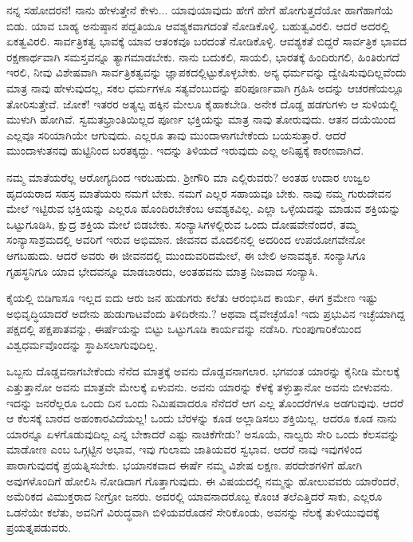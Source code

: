 ನನ್ನ ಸಹೋದರನೆ! ನಾನು ಹೇಳುತ್ತೇನೆ ಕೇಳು... ಯಾವುಯಾವುದು ಹೇಗೆ ಹೇಗೆ ಹೋಗುತ್ತದೆಯೋ ಹಾಗೆಹಾಗೆಯೆ ಬಿಡು. ಯಾವ ಬಾಹ್ಯ ಅನುಷ್ಠಾನ ಪದ್ದತಿಯೂ ಆವಶ್ಯಕವಾಗದಂತೆ ನೋಡಿಕೊಳ್ಳಿ. ಬಹುತ್ವವಿರಲಿ. ಆದರೆ ಅದರಲ್ಲಿ ಏಕತ್ವವಿರಲಿ. ಸಾರ್ವತ್ರಿ\break ಕತ್ವ ಭಾವಕ್ಕೆ ಯಾವ ಆತಂಕವೂ ಬರದಂತೆ ನೋಡಿಕೊಳ್ಳಿ. ಆವಶ್ಯಕತೆ ಬಿದ್ದರೆ ಸಾರ್ವತ್ರಿಕ ಭಾವದ ರಕ್ಷಣಾರ್ಥವಾಗಿ ಸಮಸ್ತವನ್ನೂ ತ್ಯಾಗಮಾಡಬೇಕು. ನಾನು ಬದುಕಲಿ, ಸಾಯಲಿ, ಭಾರತಕ್ಕೆ ಹಿಂದಿರುಗಲಿ, ಹಿಂತಿರುಗದೆ ಇರಲಿ, ನೀವು ವಿಶೇಷವಾಗಿ ಸಾರ್ವತ್ರಿಕತ್ವವನ್ನು ಜ್ಞಾಪಕದಲ್ಲಿಟ್ಟುಕೊಳ್ಳಬೇಕು. ಅನ್ಯ ಧರ್ಮವನ್ನು ದ್ವೇಷಿಸುವುದಿಲ್ಲವೆಂದು ಮಾತ್ರ ನಾವು ಹೇಳುವುದಲ್ಲ, ಸಕಲ ಧರ್ಮಗಳೂ ಸತ್ಯವೆಂಬುದನ್ನು ಪರಿಪೂರ್ಣವಾಗಿ ಗ್ರಹಿಸಿ ಅದನ್ನು ಆಚರಣೆಯಲ್ಲೂ ತೋರಿಸುತ್ತೇವೆ. ಜೋಕೆ! ಇತರರ ಅತ್ಯಲ್ಪ ಹಕ್ಕಿನ ಮೇಲೂ ಕೈಹಾಕಬೇಡಿ. ಅನೇಕ ದೊಡ್ಡ ಹಡಗುಗಳು ಆ ಸುಳಿಯಲ್ಲಿ ಮುಳುಗಿ ಹೋಗಿವೆ. ಸ್ವಮತಭ್ರಾಂತಿಯಿಲ್ಲದ ಪೂರ್ಣ ಭಕ್ತಿಯನ್ನು ಮಾತ್ರ ನಾವು ತೋರುವುದು. ಆತನ ದಯೆಯಿಂದ ಎಲ್ಲವೂ ಸರಿಯಾಗಿಯೇ ಆಗುವುದು. ಎಲ್ಲರೂ ತಾವು ಮುಂದಾಳಾಗಬೇಕೆಂದು ಬಯಸುತ್ತಾರೆ. ಆದರೆ ಮುಂದಾಳುತನವು ಹುಟ್ಟಿನಿಂದ ಬರತಕ್ಕದ್ದು. ಇದನ್ನು ತಿಳಿಯದೆ ಇರುವುದು ಎಲ್ಲ ಅನಿಷ್ಟಕ್ಕೆ ಕಾರಣವಾಗಿದೆ.

ನಮ್ಮ ಮಾತೆಯರೆಲ್ಲ ಆರೋಗ್ಯದಿಂದ ಇರಬಹುದು. ಶ‍್ರೀಗೌರಿ ಮಾ ಎಲ್ಲಿರುವರು? ಅಂತಹ ಉದಾರ ಉಜ್ವಲ ಹೃದಯರಾದ ಸಹಸ್ರ ಮಾತೆಯರು ನಮಗೆ ಬೇಕು. ನಮಗೆ ಎಲ್ಲರ ಸಹಾಯವೂ ಬೇಕು. ನಾವು ನಮ್ಮ ಗುರುದೇವನ ಮೇಲೆ ಇಟ್ಟಿರುವ ಭಕ್ತಿಯನ್ನು ಎಲ್ಲರೂ ಹೊಂದಿರಬೇಕೆಂಬ ಆವಶ್ಯಕವಿಲ್ಲ. ಎಲ್ಲಾ ಒಳ್ಳೆಯದನ್ನು ಮಾಡುವ ಶಕ್ತಿಯನ್ನು ಒಟ್ಟುಗೂಡಿಸಿ, ಕ್ಷುದ್ರ ಶಕ್ತಿಯ ಮೇಲೆ ಬಿಡಬೇಕು. ಸಂನ್ಯಾಸಿಗಳಲ್ಲಿರುವ ಒಂದು ದೋಷವೇನೆಂದರೆ, ತಮ್ಮ ಸಂನ್ಯಾಸಾಶ್ರಮದಲ್ಲಿ ಅವರಿಗೆ ಇರುವ ಅಭಿಮಾನ. ಜೀವನದ ಮೊದಲಿನಲ್ಲಿ ಅದರಿಂದ ಉಪಯೋಗವೇನೋ ಆಗಬಹುದು. ಆದರೆ ಅವರು ಈ ಜೀವನದಲ್ಲಿ ಮುಂದುವರಿದಮೇಲೆ, ಈ ಬೇಲಿ ಅನಾವಶ್ಯಕ. ಸಂನ್ಯಾಸಿಗೂ ಗೃಹಸ್ಥನಿಗೂ ಯಾವ ಭೇದವನ್ನೂ ಮಾಡಬಾರದು, ಅಂತಹವನು ಮಾತ್ರ ನಿಜವಾದ ಸಂನ್ಯಾಸಿ.

ಕೈಯಲ್ಲಿ ಬಿಡಿಗಾಸೂ ಇಲ್ಲದ ಐದು ಆರು ಜನ ಹುಡುಗರು ಕಲೆತು ಆರಂಭಿಸಿದ ಕಾರ್ಯ, ಈಗ ಕ್ರಮೇಣ ಇಷ್ಟು ಅಭಿವೃದ್ಧಿಯಾದರೆ ಅದೇನು ಹುಡುಗಾಟವೆಂದು ತಿಳಿದಿರೇನು.? ಅಥವಾ ದೈವೇಚ್ಛೆಯೊ! ಇದು ಪ್ರಭುವಿನ ಇಚ್ಛೆಯಾಗಿದ್ದ ಪಕ್ಷದಲ್ಲಿ ಪಕ್ಷಪಾತವನ್ನು, ಈರ್ಷೆಯನ್ನು ಬಿಟ್ಟು ಒಟ್ಟುಗೂಡಿ ಕಾರ್ಯವನ್ನು ನಡೆಸಿರಿ. ಗುಂಪುಗಾರಿಕೆಯಿಂದ ವಿಶ್ವಧರ್ಮವೊಂದನ್ನು ಸ್ಥಾಪಿಸಲಾಗುವುದಿಲ್ಲ.

ಒಬ್ಬನು ದೊಡ್ಡವನಾಗಬೇಕೆಂದು ನೆನೆದ ಮಾತ್ರಕ್ಕೆ ಅವನು ದೊಡ್ಡವನಾಗಲಾರ. ಭಗವಂತ ಯಾರನ್ನು ಕೈನೀಡಿ ಮೇಲಕ್ಕೆ ಎತ್ತುತ್ತಾನೋ ಅವನು ಮಾತ್ರವೇ ಮೇಲಕ್ಕೆ ಏಳುವನು. ಅವನು ಯಾರನ್ನು ಕೆಳಕ್ಕೆ ತಳ್ಳುತ್ತಾನೋ ಅವನು ಬೀಳುವನು. ಇದನ್ನು ಜನರೆಲ್ಲರೂ ಒಂದು ದಿನ ಒಂದು ನಿಮಿಷವಾದರೂ ನೆನೆದರೆ ಆಗ ಎಲ್ಲ ತೊಂದರೆಗಳೂ ಅಡಗುವುವು. ಆದರೆ ಆ ಕೆಲಸಕ್ಕೆ ಬಾರದ ಅಹಂಕಾರವಿದೆಯಲ್ಲ! ಒಂದು ಬೆರಳನ್ನು ಕೂಡ ಅಲ್ಲಾಡಿಸಲು ಶಕ್ತಿಯಿಲ್ಲ. ಆದರೂ ಕೂಡ ನಾನು ಯಾರನ್ನೂ ಏಳಗೊಡುವುದಿಲ್ಲ ಎನ್ನ ಬೇಕಾದರೆ ಎಷ್ಟು ನಾಚಿಕೆಗೇಡು? ಅಸೂಯೆ, ನಾಲ್ವರು ಸೇರಿ ಒಂದು ಕೆಲಸವನ್ನು ಮಾಡೋಣ ಎಂಬ ಒಗ್ಗಟ್ಟಿನ ಅಭಾವ, ಇವು ಗುಲಾಮ ಜಾತಿಯವರ ಸ್ವಭಾವ. ಆದರೆ ನಾವು ಇವುಗಳಿಂದ ಪಾರಾಗುವುದಕ್ಕೆ ಪ್ರಯತ್ನಿಸಬೇಕು. ಭಯಾನಕವಾದ ಈರ್ಷೆ ನಮ್ಮ ವಿಶೇಷ ಲಕ್ಷಣ. ಪರದೇಶಗಳಿಗೆ ಹೋಗಿ ಅವುಗಳೊಂದಿಗೆ ಹೋಲಿಸಿ ನೋಡಿದಾಗ ಗೊತ್ತಾಗುವುದು. ಈ ವಿಷಯದಲ್ಲಿ ನಮ್ಮನ್ನು ಹೋಲುವವರು ಯಾರೆಂದರೆ, ಅಮೆರಿಕದ ವಿಮುಕ್ತರಾದ ನೀಗ್ರೋ ಜನರು. ಅವರಲ್ಲಿ ಯಾವನಾದರೊಬ್ಬ ಕೊಂಚ ತಲೆಎತ್ತಿದರೆ ಸಾಕು, ಎಲ್ಲರೂ ಒಡನೆಯೇ ಕಲೆತು, ಅವನಿಗೆ ವಿರುದ್ಧವಾಗಿ ಬಿಳಿಯವರೊಡನೆ ಸೇರಿಕೊಂಡು, ಅವನನ್ನು ನೆಲಕ್ಕೆ ತುಳಿಯುವುದಕ್ಕೆ ಪ್ರಯತ್ನಪಡುವರು.

